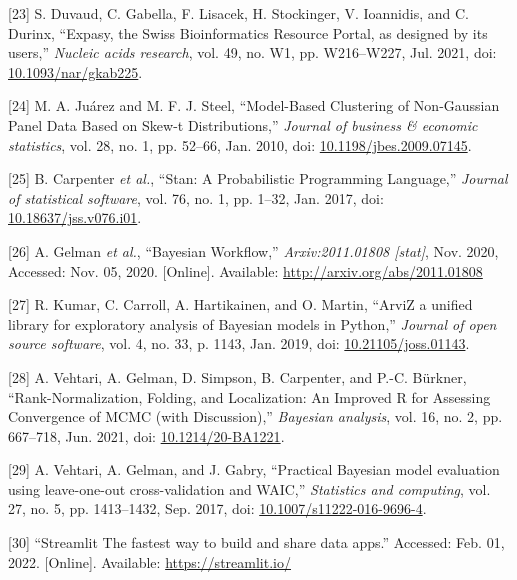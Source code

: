 \documentclass[11pt]{article}
\begin{document}
\hypertarget{citeproc_bib_item_23}{[23] S. Duvaud, C. Gabella, F. Lisacek, H. Stockinger, V. Ioannidis, and C. Durinx, “Expasy, the Swiss Bioinformatics Resource Portal, as designed by its users,” \textit{Nucleic acids research}, vol. 49, no. W1, pp. W216–W227, Jul. 2021, doi: \href{https://doi.org/10.1093/nar/gkab225}{10.1093/nar/gkab225}.}

\hypertarget{citeproc_bib_item_24}{[24] M. A. Juárez and M. F. J. Steel, “Model-Based Clustering of Non-Gaussian Panel Data Based on Skew-t Distributions,” \textit{Journal of business \& economic statistics}, vol. 28, no. 1, pp. 52–66, Jan. 2010, doi: \href{https://doi.org/10.1198/jbes.2009.07145}{10.1198/jbes.2009.07145}.}

\hypertarget{citeproc_bib_item_25}{[25] B. Carpenter \textit{et al.}, “Stan: A Probabilistic Programming Language,” \textit{Journal of statistical software}, vol. 76, no. 1, pp. 1–32, Jan. 2017, doi: \href{https://doi.org/10.18637/jss.v076.i01}{10.18637/jss.v076.i01}.}

\hypertarget{citeproc_bib_item_26}{[26] A. Gelman \textit{et al.}, “Bayesian Workflow,” \textit{Arxiv:2011.01808 [stat]}, Nov. 2020, Accessed: Nov. 05, 2020. [Online]. Available: \url{http://arxiv.org/abs/2011.01808}}

\hypertarget{citeproc_bib_item_27}{[27] R. Kumar, C. Carroll, A. Hartikainen, and O. Martin, “ArviZ a unified library for exploratory analysis of Bayesian models in Python,” \textit{Journal of open source software}, vol. 4, no. 33, p. 1143, Jan. 2019, doi: \href{https://doi.org/10.21105/joss.01143}{10.21105/joss.01143}.}

\hypertarget{citeproc_bib_item_28}{[28] A. Vehtari, A. Gelman, D. Simpson, B. Carpenter, and P.-C. Bürkner, “Rank-Normalization, Folding, and Localization: An Improved R for Assessing Convergence of MCMC (with Discussion),” \textit{Bayesian analysis}, vol. 16, no. 2, pp. 667–718, Jun. 2021, doi: \href{https://doi.org/10.1214/20-BA1221}{10.1214/20-BA1221}.}

\hypertarget{citeproc_bib_item_29}{[29] A. Vehtari, A. Gelman, and J. Gabry, “Practical Bayesian model evaluation using leave-one-out cross-validation and WAIC,” \textit{Statistics and computing}, vol. 27, no. 5, pp. 1413–1432, Sep. 2017, doi: \href{https://doi.org/10.1007/s11222-016-9696-4}{10.1007/s11222-016-9696-4}.}

\hypertarget{citeproc_bib_item_30}{[30] “Streamlit The fastest way to build and share data apps.” Accessed: Feb. 01, 2022. [Online]. Available: \url{https://streamlit.io/}}
\end{document}
